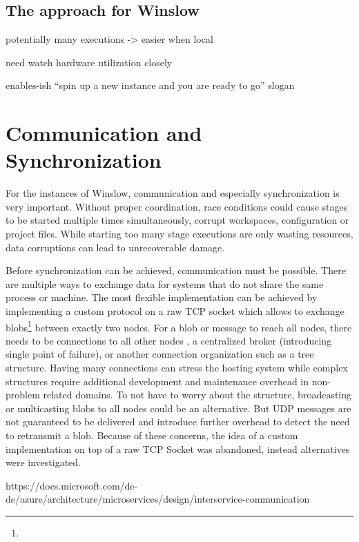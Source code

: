 

\subsection{The approach for Winslow}


potentially many executions -> easier when local

need watch hardware utilization closely

enables-ish \enquote{spin up a new instance and you are ready to go} slogan

\section{Communication and Synchronization}

For the instances of Winslow, communication and especially synchronization is very important.
Without proper coordination, race conditions could cause stages to be started multiple times simultaneously, corrupt workspaces, configuration or project files.
While starting too many stage executions are only wasting resources, data corruptions can lead to unrecoverable damage.

Before synchronization can be achieved, communication must be possible.
There are multiple ways to exchange data for systems that do not share the same process or machine.
The most flexible implementation can be achieved by implementing a custom protocol on a raw TCP socket which allows to exchange blobs\footnote{} between exactly two nodes.
For a blob or message to reach all nodes, there needs to be connections to all other nodes , a centralized broker (introducing single point of failure), or another connection organization such as a tree structure.
Having many connections can stress the hosting system while complex structures require additional development and maintenance overhead in non-problem related domains.
To not have to worry about the structure, broadcasting or multicasting blobs to all nodes could be an alternative.
But UDP messages are not guaranteed to be delivered and introduce further overhead to detect the need to retransmit a blob.
Because of these concerns, the idea of a custom implementation on top of a raw TCP Socket was abandoned, instead alternatives were investigated.


https://docs.microsoft.com/de-de/azure/architecture/microservices/design/interservice-communication



